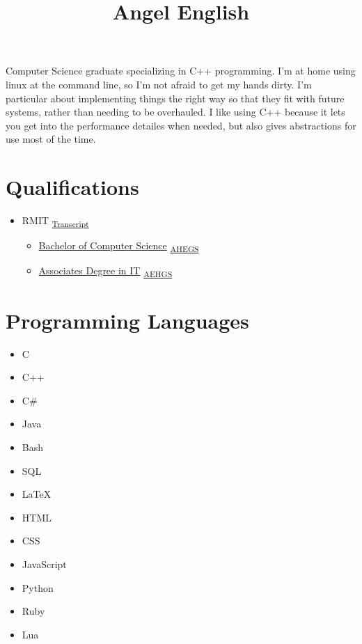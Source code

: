 \documentclass{amsart}
\title{Angel English}
\theoremstyle{definition} %
\begin{document}
\maketitle

Computer Science graduate specializing in C++ programming.
I'm at home using linux at the command line, so I'm not afraid to get
my hands dirty. I'm particular about implementing things the right
way so that they fit with future systems, rather than needing to be
overhauled. I like using C++ because it lets you get into the
performance detailes when needed, but also gives abstractions for
use most of the time.

\section{Qualifications}

\begin{itemize}
	\item
		RMIT
		\textsubscript{
			\href{https://www.myequals.net/sharelink/9ea57606-24b8-45e4-8030-4db56b0bee20/1c373231-4325-435c-b587-dab0f3481f64}{Transcript}
		}
		\begin{itemize}
			\item
				\href{https://www.myequals.net/sharelink/772babfa-f554-43b1-af4c-294eecf0b1df/f43434a3-e222-4b80-a4d9-2513723adb43}{Bachelor of Computer Science}
				\textsubscript{
					\href{https://www.myequals.net/sharelink/0ca660ab-7f1b-42fd-861b-e9b03df80363/0f37473b-f685-41bb-abd6-98d1e9dd7fb0}{AHEGS}
				}
			\item
				\href{https://www.myequals.net/sharelink/46bae55d-6a51-42f2-a6d3-ad1b9bab7f02/3dc307bb-09b1-43f1-b319-ee16fa643d2f}{Associates Degree in IT}
				\textsubscript{
					\href{https://www.myequals.net/sharelink/9ca4d745-4601-416f-a0fd-5c7334088e4a/49e877ab-89ee-4c36-a9d1-fd9f9911dc0a}{AEHGS}
				}
		\end{itemize}
\end{itemize}

\section{Programming Languages}

\begin{itemize}
	\item C
	\item C++
	\item C\#
	\item Java
	\item Bash
	\item SQL
	\item \LaTeX
	\item HTML
	\item CSS
	\item JavaScript
	\item Python
	\item Ruby
	\item Lua
\end{itemize}
\end{document}
